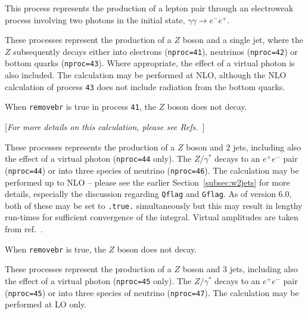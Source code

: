 \label{subsec:gg2lep}

This process represents the production of a lepton pair through an electroweak
process involving two photons in the initial state, $\gamma\gamma \to e^- e^+$.


\label{subsec:zjet}

These processes represent the production of a $Z$ boson and a single jet,
where the $Z$ subsequently
decays either into electrons ({\tt nproc=41}), neutrinos ({\tt nproc=42})
or bottom quarks ({\tt nproc=43}). Where appropriate, the effect of a virtual
photon is also included. The calculation may be performed at NLO,
although the NLO calculation of process {\tt 43} does not include radiation
from the bottom quarks.

When {\tt removebr} is true in process {\tt 41}, the $Z$ boson does not decay.

\label{subsec:z2jets}

\begin{center}
[{\it For more details on this calculation, please see Refs.~\cite{Campbell:2002tg,Campbell:2003hd}}]
\end{center}

These processes represents the production of a $Z$ boson and $2$ jets,
including also the effect of a virtual photon ({\tt nproc=44} only). The $Z/\gamma^*$ decays
to an $e^+ e^-$ pair ({\tt nproc=44}) or into three species of neutrino ({\tt nproc=46}).
The calculation may be performed up to NLO --
please see the earlier Section~\ref{subsec:w2jets} for more details,
especially the discussion regarding {\tt Qflag} and {\tt Gflag}.
As of version 6.0, both of these may be set to {\tt .true.} simultaneously but this
may result in lengthy run-times for sufficient convergence of the integral.
Virtual amplitudes are taken from ref.~\cite{Bern:1997sc}.

When {\tt removebr} is true, the $Z$ boson does not decay.


\label{subsec:z3jets}

These processes represent the production of a $Z$ boson and $3$ jets,
including also the effect of a virtual photon ({\tt nproc=45} only). The $Z/\gamma^*$ decays
to an $e^+ e^-$ pair ({\tt nproc=45}) or into three species of neutrino ({\tt nproc=47}).
The calculation may be performed at LO only.


